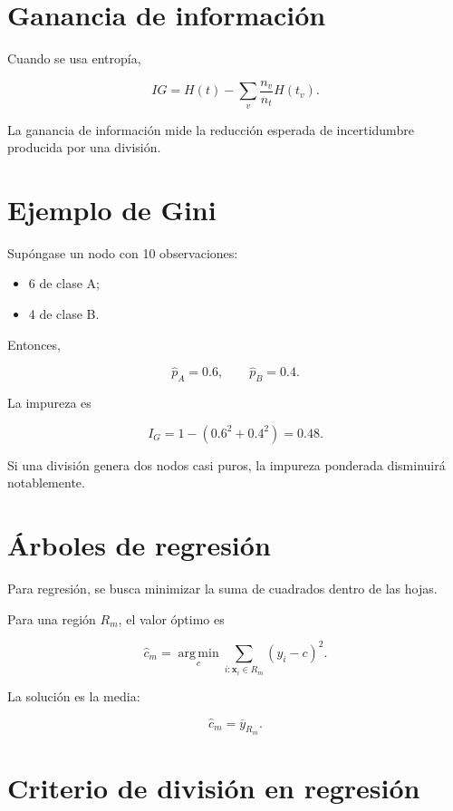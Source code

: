 \documentclass[
  spanish,
  11pt,
  letterpaper,
  DIV=11,
  numbers=noendperiod]{scrreprt}
\providecommand{\tightlist}{%
  \setlength{\itemsep}{0pt}\setlength{\parskip}{0pt}}
\theoremstyle{definition}
\theoremstyle{plain}
\theoremstyle{definition}
\theoremstyle{remark}
\begin{document}
\section{Ganancia de información}\label{ganancia-de-informaciuxf3n}

Cuando se usa entropía,

\[
IG
=
H(t)
-
\sum_{v}
\frac{n_v}{n_t}H(t_v).
\]

La ganancia de información mide la reducción esperada de incertidumbre
producida por una división.

\section{Ejemplo de Gini}\label{ejemplo-de-gini}

Supóngase un nodo con 10 observaciones:

\begin{itemize}
\tightlist
\item
  6 de clase A;
\item
  4 de clase B.
\end{itemize}

Entonces,

\[
\widehat{p}_A=0.6,
\qquad
\widehat{p}_B=0.4.
\]

La impureza es

\[
I_G
=
1-(0.6^2+0.4^2)
=
0.48.
\]

Si una división genera dos nodos casi puros, la impureza ponderada
disminuirá notablemente.

\section{Árboles de regresión}\label{uxe1rboles-de-regresiuxf3n}

Para regresión, se busca minimizar la suma de cuadrados dentro de las
hojas.

Para una región \(R_m\), el valor óptimo es

\[
\widehat{c}_m
=
\operatorname*{arg\,min}_{c}
\sum_{i:\mathbf{x}_i\in R_m}
(y_i-c)^2.
\]

La solución es la media:

\[
\widehat{c}_m
=
\overline{y}_{R_m}.
\]

\section{Criterio de división en
regresión}\label{criterio-de-divisiuxf3n-en-regresiuxf3n}
\end{document}
